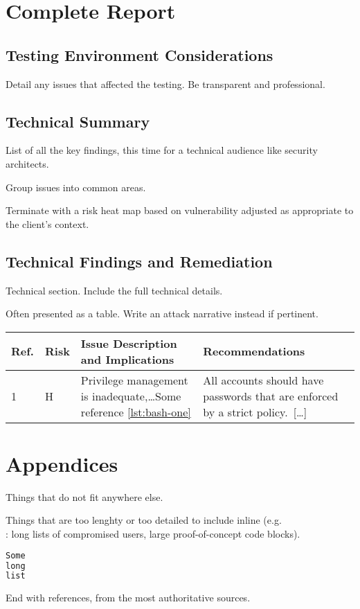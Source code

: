 \documentclass[a4paper, 12pt]{report}
\begin{document}
\chapter{Complete Report}
\section{Testing Environment Considerations}

Detail any issues that affected the testing. Be transparent and professional.

\section{Technical Summary}
List of all the key findings, this time for a technical audience like
security architects.

Group issues into common areas.

Terminate with a risk heat map based on vulnerability adjusted as appropriate
to the client's context.

\section{Technical Findings and Remediation}
Technical section. Include the full technical details.

Often presented as a table. Write an attack narrative instead if pertinent.

\begin{tabular}{llp{}p{}}
	\toprule
	Ref. & Risk & Issue Description and Implications & Recommendations \\
	\midrule
	1 & H & Privilege management is inadequate,\ldots Some reference \ref{lst:bash-one} & All accounts should have passwords that are enforced by a strict policy.~[\ldots] \\
	\bottomrule
\end{tabular}

\chapter{Appendices}
Things that do not fit anywhere else.

Things that are too lenghty or too detailed to include inline (e.g.\\: long lists of compromised users, large proof-of-concept code blocks).

\label{listing:bash1}
\begin{lstlisting}[caption=Some long listing.,language=sh, label=lst:bash-one]
Some
long
list
\end{lstlisting}

End with references, from the most authoritative sources.
\end{document}
